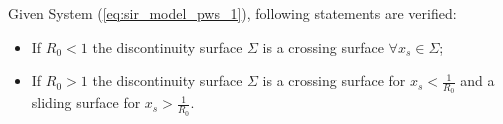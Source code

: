 \begin{theorem}
Given System (\ref{eq:sir_model_pws_1}), following statements are verified:
\begin{itemize}
    \item If $R_0 < 1$ the discontinuity surface $\Sigma$ is a crossing surface $\forall x_s \in \Sigma$;
    \item If $R_0 > 1$ the discontinuity surface $\Sigma$ is a crossing surface for $x_s < \frac{1}{R_0}$ and a sliding surface for $x_s > \frac{1}{R_0}$.
\end{itemize}
\end{theorem}